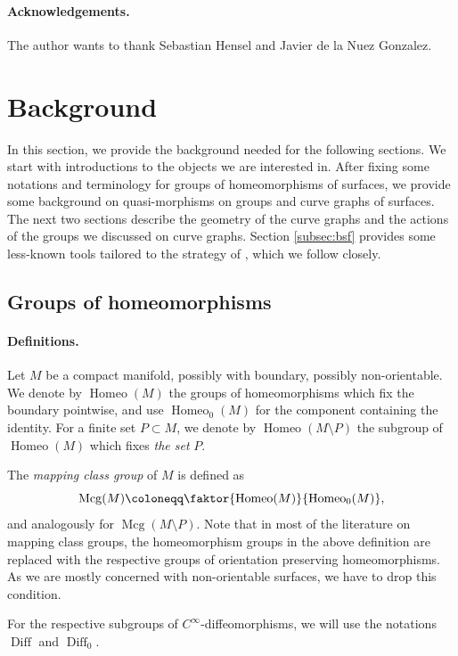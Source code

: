 \documentclass[a4paper]{article}
\begin{document}
\paragraph{Acknowledgements.}
The author wants to thank Sebastian Hensel and Javier de la Nuez Gonzalez.

\section{Background}
In this section, we provide the background needed for the following sections.
We start with introductions to the objects we are interested in.
After fixing some notations and terminology for groups of homeomorphisms of surfaces, we provide some background on quasi-morphisms on groups and curve graphs of surfaces.
The next two sections describe the geometry of the curve graphs and the actions of the groups we discussed on curve graphs.
Section \ref{subsec:bsf} provides some less-known tools tailored to the strategy of \cite{BHW2}, which we follow closely.

\subsection{Groups of homeomorphisms}
\paragraph{Definitions.}
Let $M$ be a compact manifold, possibly with boundary, possibly non-orientable.
We denote by $\operatorname{Homeo}(M)$ the groups of homeomorphisms which fix the boundary pointwise, and use $\operatorname{Homeo}_0(M)$ for the component containing the identity.
For a finite set $P\subset M$, we denote by $\operatorname{Homeo}(M\setminus P)$ the subgroup of $\operatorname{Homeo}(M)$ which fixes \emph{the set} $P$.

The \emph{mapping class group} of $M$ is defined as 
\[\operatorname{Mcg}(M) \coloneqq \faktor{\operatorname{Homeo}(M)}{\operatorname{Homeo}_0(M)},\]
and analogously for $\operatorname{Mcg}(M\setminus P)$.
Note that in most of the literature on mapping class groups, the homeomorphism groups in the above definition are replaced with the respective groups of orientation preserving homeomorphisms.
As we are mostly concerned with non-orientable surfaces, we have to drop this condition.

For the respective subgroups of $C^\infty$-diffeomorphisms, we will use the notations $\operatorname{Diff}$ and $\operatorname{Diff}_0$.
\end{document}
